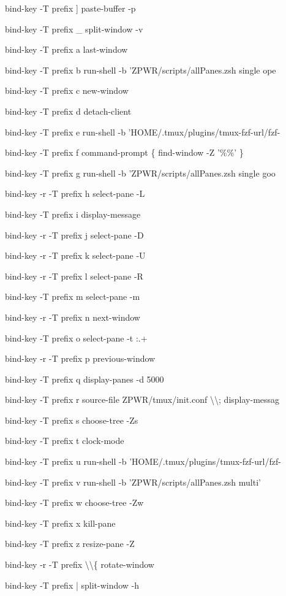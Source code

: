 \documentclass[11pt,a4paper,twoside]{book}
\begin{document}
bind-key  -T prefix  ]  paste-buffer -p

bind-key  -T prefix  \_  split-window -v

bind-key  -T prefix  a  last-window

bind-key  -T prefix  b  run-shell -b 'ZPWR/scripts/allPanes.zsh single ope

bind-key  -T prefix  c  new-window

bind-key  -T prefix  d  detach-client

bind-key  -T prefix  e  run-shell -b 'HOME/.tmux/plugins/tmux-fzf-url/fzf-

bind-key  -T prefix  f  command-prompt \{ find-window -Z '\%\%' \}

bind-key  -T prefix  g  run-shell -b 'ZPWR/scripts/allPanes.zsh single goo

bind-key -r -T prefix  h  select-pane -L

bind-key  -T prefix  i  display-message

bind-key -r -T prefix  j  select-pane -D

bind-key -r -T prefix  k  select-pane -U

bind-key -r -T prefix  l  select-pane -R

bind-key  -T prefix  m  select-pane -m

bind-key -r -T prefix  n  next-window

bind-key  -T prefix  o  select-pane -t :.+

bind-key -r -T prefix  p  previous-window

bind-key  -T prefix  q  display-panes -d 5000

bind-key  -T prefix  r  source-file ZPWR/tmux/init.conf \textbackslash{}\textbackslash{}; display-messag

bind-key  -T prefix  s  choose-tree -Zs

bind-key  -T prefix  t  clock-mode

bind-key  -T prefix  u  run-shell -b 'HOME/.tmux/plugins/tmux-fzf-url/fzf-

bind-key  -T prefix  v  run-shell -b 'ZPWR/scripts/allPanes.zsh multi'

bind-key  -T prefix  w  choose-tree -Zw

bind-key  -T prefix  x  kill-pane

bind-key  -T prefix  z  resize-pane -Z

bind-key -r -T prefix  \textbackslash{}\textbackslash{}\{  rotate-window

bind-key  -T prefix  |  split-window -h
\end{document}
